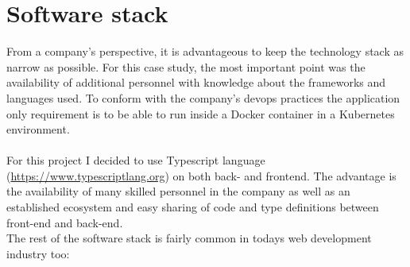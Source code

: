 \section{Software stack}
From a company's perspective, it is advantageous to keep the technology stack as narrow as possible.
For this case study, the most important point was the availability of additional personnel with knowledge about the frameworks and languages used.
To conform with the company's \Gls{devops} practices the application only requirement is to be able to run inside a Docker container in a Kubernetes environment.
\\\\
For this project I decided to use Typescript language (\url{https://www.typescriptlang.org}) on both back- and frontend.
The advantage is the availability of many skilled personnel in the company as well as an established ecosystem and easy sharing of code and type definitions between front-end and back-end.
\\
The rest of the software stack is fairly common in todays web development industry too:

